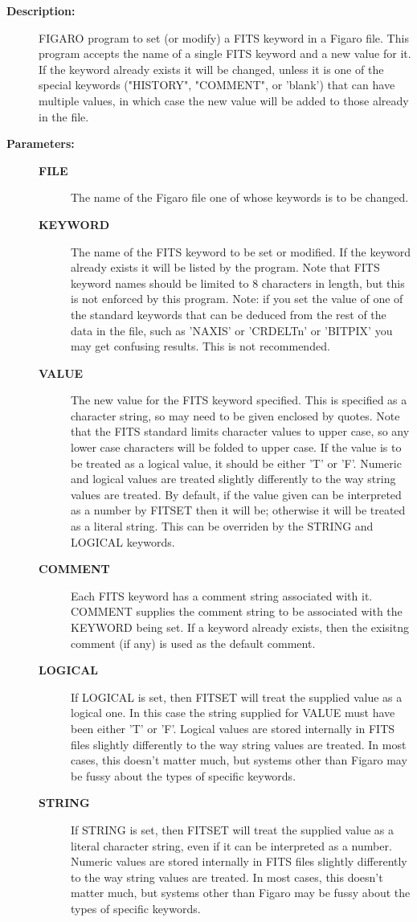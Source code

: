 \begin{description}
\begin{description}
\item [\textbf{Description:}]
 FIGARO program to set (or modify) a FITS keyword in a Figaro file.
 This program accepts the name of a single FITS keyword and a new
 value for it. If the keyword already exists it will be changed,
 unless it is one of the special keywords ("HISTORY", "COMMENT",
 or 'blank') that can have multiple values, in which case the new
 value will be added to those already in the file.

\item [\textbf{Parameters:}]
\begin{description}
\item [\textbf{FILE}]
 The name of the Figaro file one of whose keywords
 is to be changed.
\item [\textbf{KEYWORD}]
 The name of the FITS keyword to be set or modified.
 If the keyword already exists it will be listed by
 the program.  Note that FITS keyword names should
 be limited to 8 characters in length, but this is not
 enforced by this program. Note: if you set the value
 of one of the standard keywords that can be deduced
 from the rest of the data in the file, such as 'NAXIS'
 or 'CRDELTn' or 'BITPIX' you may get confusing results.
 This is not recommended.
\item [\textbf{VALUE}]
 The new value for the FITS keyword specified.  This is
 specified as a character string, so may need to be given
 enclosed by quotes. Note that the FITS standard limits
 character values to upper case, so any lower case characters
 will be folded to upper case. If the value is to be treated
 as a logical value, it should be either 'T' or 'F'. Numeric
 and logical values are treated slightly differently to the
 way string values are treated. By default, if the value given
 can be interpreted as a number by FITSET then it will be;
 otherwise it will be treated as a literal string. This can
 be overriden by the STRING and LOGICAL keywords.
\item [\textbf{COMMENT}]
 Each FITS keyword has a comment string associated with it.
 COMMENT supplies the comment string to be associated with
 the KEYWORD being set. If a keyword already exists, then
 the exisitng comment (if any) is used as the default comment.
\item [\textbf{LOGICAL}]
 If LOGICAL is set, then FITSET will treat the supplied
 value as a logical one. In this case the string supplied for
 VALUE must have been either 'T' or 'F'. Logical values are
 stored internally in FITS files slightly differently to the
 way string values are treated. In most cases, this doesn't
 matter much, but systems other than Figaro may be fussy about
 the types of specific keywords.
\item [\textbf{STRING}]
 If STRING is set, then FITSET will treat the supplied
 value as a literal character string, even if it can be
 interpreted as a number. Numeric values are stored internally
 in FITS files slightly differently to the way string values
 are treated. In most cases, this doesn't matter much, but
 systems other than Figaro may be fussy about the types of
 specific keywords.
\end{description}


\end{description}
\end{description}
